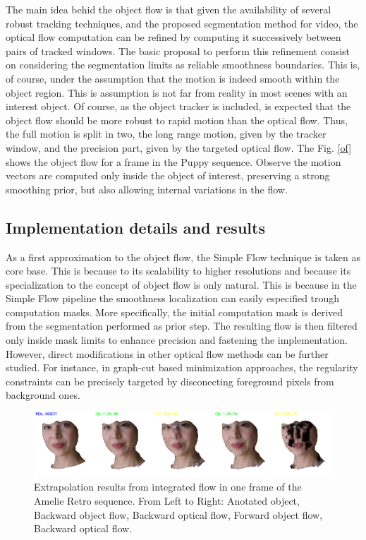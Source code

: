 The main idea behid the object flow is that given the availability of several robust tracking techniques, and the proposed
segmentation method for video, the optical flow computation can be refined by computing it successively between pairs
of tracked windows. The basic proposal to perform this refinement consist on considering the segmentation limits  as reliable smoothness boundaries. 
This is, of course, under the assumption that the motion is indeed smooth within the object region. 
This is assumption is not far from reality in most scenes with an interest object. 
Of course, as the object tracker is included, is expected that the object flow should be more robust to rapid motion than the
optical flow. 
Thus, the full motion is split in two, the long range motion, given by the tracker window, and the precision part, given by the targeted optical flow. The Fig. \ref{of} shows 
the object flow for a frame in the Puppy sequence. Observe the motion vectors are computed only inside the object of interest, preserving a strong smoothing prior, but 
also allowing internal variations in the flow.

\subsection{Implementation details and results}

As a first approximation to the object flow, the Simple Flow technique \cite{c21} is taken as core base. This is because to its scalability 
to higher resolutions and because its specialization to the concept of object flow is only natural. This is because in the Simple Flow pipeline 
the smoothness localization can easily especified trough computation masks. More specifically, the initial computation mask is derived from 
the segmentation performed as prior step. The resulting flow is then filtered only inside mask limits to enhance precision and fastening the 
implementation. However, direct modifications in other optical flow methods can be further studied. For instance, in graph-cut based 
minimization approaches, the regularity constraints can be precisely targeted by disconecting foreground pixels from background ones.

   \begin{figure}[thpb]
      \centering
      \includegraphics[width=1.00\textwidth]{images/extrapolated.png}
      \caption{Extrapolation results from integrated flow in one frame of the Amelie Retro sequence. From Left to Right: Anotated object, Backward object flow, Backward optical flow, Forward object flow, Backward optical flow.}
      \label{sample}
   \end{figure}


